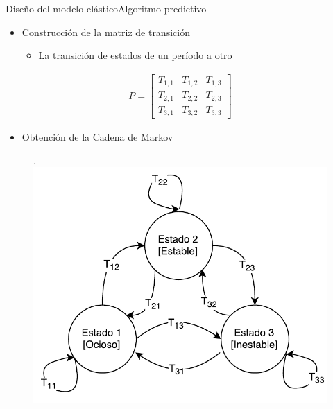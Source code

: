 \begin{frame}{Diseño del modelo elástico}{Algoritmo predictivo}
\begin{multicols}{2}
\begin{itemize}
	\item Construcción de la matriz de transición
		\begin{itemize}
			\item La transición de estados de un período a otro
		\end{itemize}
\end{itemize}
\begin{center}
\begin{align*}
	P =
	\begin{bmatrix}
		T_{1,1} & T_{1,2} & T_{1,3} \\
		T_{2,1} & T_{2,2} & T_{2,3} \\
		T_{3,1} & T_{3,2} & T_{3,3}
	\end{bmatrix}	
\end{align*}
\end{center}

\vspace*{10cm}

\begin{itemize}
	\item Obtención de la Cadena de Markov
\end{itemize}
\begin{figure}[ht!].
  \centering
    \includegraphics[scale=0.35]{images/CadenaMarkovPredictiva.pdf}
\end{figure}
\end{multicols}
\end{frame}

